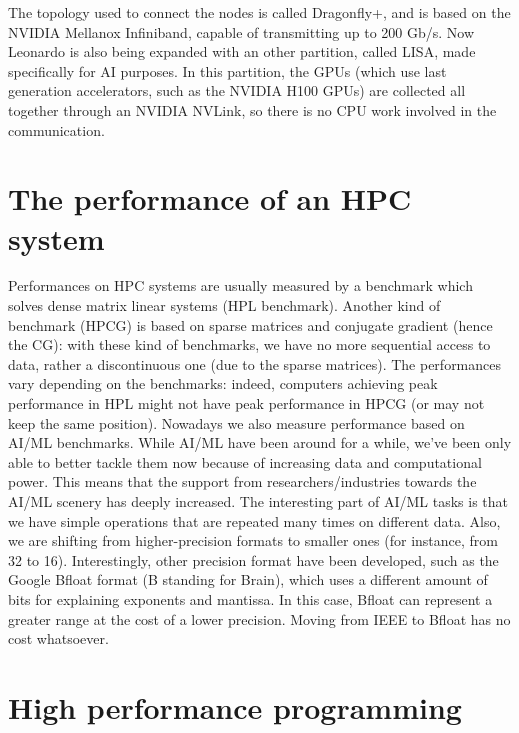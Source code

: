 The topology used to connect the nodes is called Dragonfly+, and is based on the NVIDIA Mellanox Infiniband, capable of transmitting up to 200 Gb/s.
\nwl
Now Leonardo is also being expanded with an other partition, called LISA, made specifically for AI purposes. In this partition, the GPUs (which use last generation accelerators, such as the NVIDIA H100 GPUs) are collected all together through an NVIDIA NVLink, so there is no CPU work involved in the communication.

\section{The performance of an HPC system}

Performances on HPC systems are usually measured by a benchmark which solves dense matrix linear systems (HPL benchmark). Another kind of benchmark (HPCG) is based on sparse matrices and conjugate gradient (hence the CG): with these kind of benchmarks, we have no more sequential access to data, rather a discontinuous one (due to the sparse matrices).
\nwl
The performances vary depending on the benchmarks: indeed, computers achieving peak performance in HPL might not have peak performance in HPCG (or may not keep the same position).
\nwl
Nowadays we also measure performance based on AI/ML benchmarks. While AI/ML have been around for a while, we've been only able to better tackle them now because of increasing data and computational power. This means that the support from researchers/industries towards the AI/ML scenery has deeply increased. The interesting part of AI/ML tasks is that we have simple operations that are repeated many times on different data.
\nwl
Also, we are shifting from higher-precision formats to smaller ones (for instance, from 32 to 16). Interestingly, other precision format have been developed, such as the Google Bfloat format (B standing for Brain), which uses a different amount of bits for explaining exponents and mantissa. In this case, Bfloat can represent a greater range at the cost of a lower precision. Moving from IEEE to Bfloat has no cost whatsoever.

\section{High performance programming}

